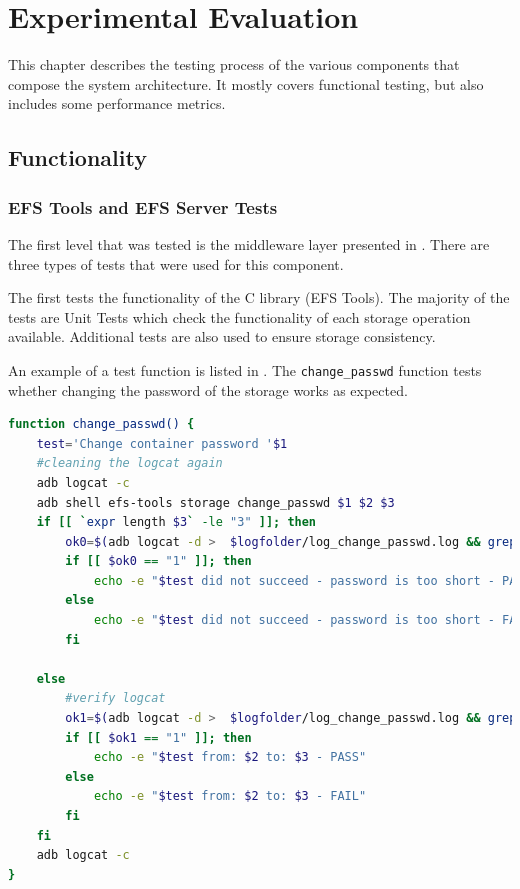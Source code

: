 \chapter{Experimental Evaluation}
\label{chapter:eval}

This chapter describes the testing process of the various components that compose the system architecture. It mostly covers functional testing, but also includes some performance metrics.

\section{Functionality}
\label{sec:func-eval}

\subsection{EFS Tools and EFS Server Tests}
\label{sub-sec:efs-tools-server-tests-eval}

The first level that was tested is the middleware layer presented in . There are three types of tests that were used for this component.

The first tests the functionality of the C library (EFS Tools). The majority of the tests are Unit Tests which check the functionality of each storage operation available. Additional tests are also used to ensure storage consistency.

An example of a test function is listed in . The \texttt{change_passwd} function tests whether changing the password of the storage works as expected.

\begin{lstlisting}[language=bash, basicstyle=\small, caption=change_passwd test function, label=lst:change-passwd-eval]
function change_passwd() {
    test='Change container password '$1
    #cleaning the logcat again
    adb logcat -c
    adb shell efs-tools storage change_passwd $1 $2 $3
    if [[ `expr length $3` -le "3" ]]; then
        ok0=$(adb logcat -d >  $logfolder/log_change_passwd.log && grep -c 'New passwd too short' $logfolder/log_change_passwd.log)
        if [[ $ok0 == "1" ]]; then
            echo -e "$test did not succeed - password is too short - PASS"
        else
            echo -e "$test did not succeed - password is too short - FAIL"
        fi

    else
        #verify logcat
        ok1=$(adb logcat -d >  $logfolder/log_change_passwd.log && grep -c 'Change passwd successful for '$1' storage' $logfolder/log_change_passwd.log)
        if [[ $ok1 == "1" ]]; then
            echo -e "$test from: $2 to: $3 - PASS"
        else
            echo -e "$test from: $2 to: $3 - FAIL"
        fi
    fi
    adb logcat -c
}
\end{lstlisting}

